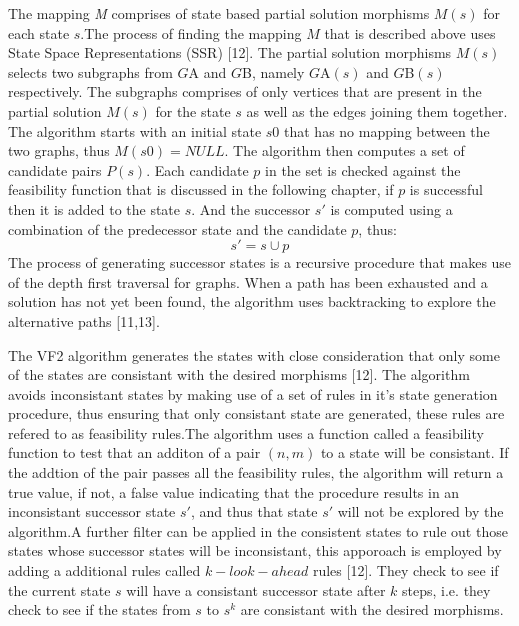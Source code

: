 The mapping \textit{M} comprises of state based partial solution morphisms $M(s)$ for each state $s$.The process of finding the mapping $M$ that is described above uses State Space Representations (SSR) [12].
The partial solution morphisms $M(s)$ selects two subgraphs from $G${\tiny A} and $G${\tiny B}, namely $G${\tiny A}$(s)$ and $G${\tiny B}$(s)$ respectively. The subgraphs comprises of only vertices that are present in the partial solution $M(s)$ for the state $s$ as well as the edges joining them together.\newline\newline
The algorithm starts with an initial state $s0$ that has no mapping between the two graphs, thus $M(s0)= NULL$. The algorithm then computes a set of candidate pairs $P(s)$. Each candidate $p$ in the set is checked against the feasibility function that is discussed in the following chapter, if $p$ is successful then it is added to the state $s$. And the successor $s'$ is computed using a combination of the predecessor state and the candidate $p$, thus:
      \begin{equation}
	      s' = s \cup p
      \end{equation}
The process of generating successor states is a recursive procedure that makes use of the depth first traversal for graphs. When a path has been 
exhausted and a solution has not yet been found, the algorithm uses backtracking to explore the alternative paths [11,13]. \newpage

The VF2 algorithm generates the states with close consideration that only some of the states are consistant with the desired morphisms [12]. The algorithm avoids inconsistant states by making use of a set of rules in it's state generation procedure, thus ensuring that only consistant state are generated, these rules are refered to as feasibility rules.\newline\newline The algorithm uses a function called a feasibility function to test that an additon of a pair $(n,m)$ to a state will be consistant. If the addtion of the pair passes all the feasibility rules, the algorithm will return a true value, if not, a false value indicating that the procedure results in an inconsistant successor  state $s'$, and thus that state $s'$ will not be explored by the algorithm.\newline\newline A further filter can be applied in the consistent states to rule out those states whose successor states will be inconsistant, this apporoach is employed by adding a additional rules called $k-look-ahead$ rules [12]. They check to see if the current state $s$ will have a consistant successor state after $k$ steps, i.e. they check to see if the states from $s$ to $s^k$ are consistant with the desired morphisms.

